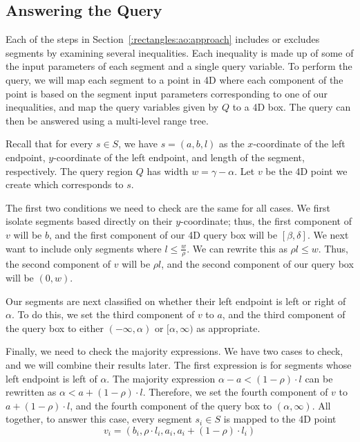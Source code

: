 \subsection{Answering the Query}
\label{:rectangles:ap:analysis}

Each of the steps in Section~\ref{:rectangles:ao:approach} includes or excludes segments by examining several inequalities. Each inequality is made up of some of the input parameters of each segment and a single query variable. To perform the query, we will map each segment to a point in 4D where each component of the point is based on the segment input parameters corresponding to one of our inequalities, and map the query variables given by $Q$ to a 4D box.  The query can then be answered using a multi-level range tree.

Recall that for every $s \in S$, we have $s = (a, b, l)$ as the $x$-coordinate of the left endpoint, $y$-coordinate of the left endpoint, and length of the segment, respectively.  The query region $Q$ has width $w = \gamma - \alpha$. Let $v$ be the 4D point we create which corresponds to $s$.

The first two conditions we need to check are the same for all cases. We first isolate segments based directly on their $y$-coordinate; thus, the first component of $v$ will be $b$, and the first component of our 4D query box will be $[\beta, \delta]$.  We next want to include only segments where $l \leq \frac{w}{\rho}$. We can rewrite this as $\rho l \leq w$. Thus, the second component of $v$ will be $\rho l$, and the second component of our query box will be $(0, w)$.

Our segments are next classified on whether their left endpoint is left or right of $\alpha$. To do this, we set the third component of $v$ to $a$, and the third component of the query box to either $(-\infty, \alpha)$ or $[\alpha, \infty)$ as appropriate.

Finally, we need to check the majority expressions. We have two cases to check, and we will combine their results later. The first expression is for segments whose left endpoint is left of $\alpha$. The majority expression $\alpha - a < (1 - \rho) \cdot l$ can be rewritten as $\alpha < a + (1-\rho) \cdot l$. Therefore, we set the fourth component of $v$ to $a + (1 - \rho) \cdot l$, and the fourth component of the query box to $(\alpha, \infty)$.  All together, to answer this case, every segment $s_i \in S$ is mapped to the 4D point 
\[ 
v_i = (b_i, \rho \cdot l_i, a_i, a_i + (1-\rho) \cdot l_i)
\]

